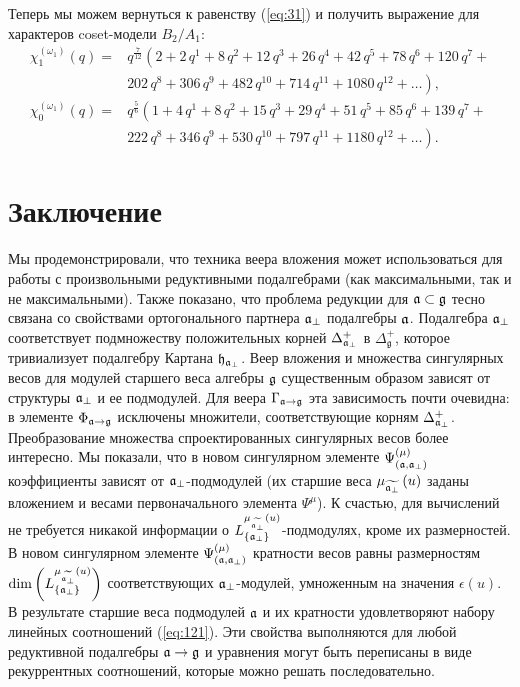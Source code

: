 Теперь мы можем вернуться к равенству (\ref{eq:31}) и получить выражение для характеров coset-модели $B_2/A_1$:
\begin{equation*}
  \label{eq:35}
  \begin{array}{cc}
    \chi^{(\omega_1)}_{1}(q)= & q^{\frac{7}{12}}\left( 2+2\,q^{1}+8\,q^{2}+12\,q^{3}+26\,q^{4}+42\,q^{5}+78\,q^{6}+120\,q^{7}+\right. \\
    & \left. 202\,q^{8}+306\,q^{9}+482\,q^{10}+714\,q^{11}+1080\,q^{12}+\dots \right),\\
    \chi^{(\omega_1)}_{0}(q) = & q^{\frac{5}{6}}\left(1 + 4\,q^{1}+ 8\,q^{2}+ 15\,q^{3}+ 29\,q^{4}+ 51\,q^{5}+ 85\,q^{6}+ 139\,q^{7}+\right. \\
    &\left. 222\,q^{8}+ 346\,q^{9}+ 530\,q^{10}+ 797\,q^{11}+ 1180\,q^{12}+\dots\right).
  \end{array}
\end{equation*}

\section{Заключение}
\label{sec:conclusion}

Мы продемонстрировали, что техника веера вложения может использоваться для работы с произвольными редуктивными подалгебрами (как максимальными, так и не максимальными). Также показано, что проблема редукции для  $\mathfrak{a} \subset \mathfrak{g}$ тесно связана со свойствами ортогонального партнера $ \mathfrak{a}_{\perp} $ подалгебры $\mathfrak{a}$. Подалгебра  $\mathfrak{a}_{\perp}$ соответствует подмножеству положительных корней $\Delta^{+}_{\mathfrak{a}_{\perp}}$ в $\Delta_{\mathfrak{g}}^{+}$, которое тривиализует подалгебру Картана $\mathfrak{h}_{\mathfrak{a}_{\perp}}$. Веер вложения и множества сингулярных весов для модулей старшего веса алгебры $\mathfrak{g}$ существенным образом зависят от структуры  $\mathfrak{a}_{\perp}$ и ее подмодулей.  Для веера  $\Gamma_{\mathfrak{a}\rightarrow \mathfrak{g}}$ эта зависимость почти очевидна: в элементе  $\Phi_{\mathfrak{a}\rightarrow \mathfrak{g}}$ исключены множители, соответствующие корням  $\Delta^{+}_{\mathfrak{a}_{\perp}}$. Преобразование множества спроектированных сингулярных весов более интересно. Мы показали, что в новом сингулярном элементе $\Psi ^{\left( \mu \right) }_{\left(  \mathfrak{a}, \mathfrak{a}_{\perp} \right)}$ коэффициенты зависят от $\mathfrak{a}_{\perp}$-подмодулей (их старшие веса $\mu _{\widetilde{\mathfrak{a}_{\perp}}}\left( u\right)$ заданы вложением и весами первоначального элемента $\Psi^{\mu}$). К счастью, для вычислений не требуется никакой информации о  $L^{\mu _{\widetilde{\mathfrak{a}_{\perp}}}\left( u\right)}_{\left\{ \mathfrak{a}_{\perp} \right\}}$-подмодулях, кроме их размерностей. В новом сингулярном элементе $\Psi ^{\left( \mu \right) }_{\left(  \mathfrak{a}, \mathfrak{a}_{\perp} \right)}$ кратности весов равны размерностям $\dim\left(L^{\mu _{\widetilde{\mathfrak{a}_{\perp}}}\left( u\right)}_{\left\{ \mathfrak{a}_{\perp} \right\}}\right)$ соответствующих  $\mathfrak{a}_{\perp}$-модулей, умноженным на значения $\epsilon (u)$. В результате старшие веса подмодулей $\mathfrak{a}$ и их кратности удовлетворяют набору линейных соотношений (\ref{eq:121}). Эти свойства выполняются для любой редуктивной подалгебры $\mathfrak{a}\rightarrow \mathfrak{g}$ и уравнения могут быть переписаны в виде рекуррентных соотношений, которые можно решать последовательно.


